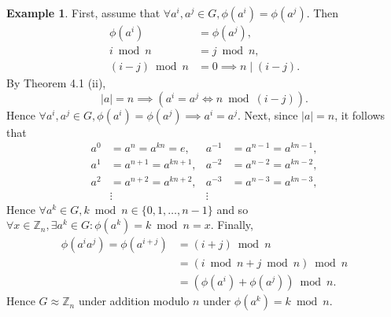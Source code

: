 \documentclass{article}
\theoremstyle{definition}
\newtheorem{example}{Example}[section]
\begin{document}
\begin{example}
    First, assume that $\forall a^i,a^j \in G, \phi(a^i) = \phi(a^j)$. Then
    \begin{align*}
        \phi(a^i) &= \phi(a^j), \\
        i \bmod n &= j \bmod n, \\
        (i-j) \bmod n &= 0 \implies n \mid (i-j).
    \end{align*}
    By Theorem 4.1 (ii),
    \begin{equation*}
        |a| = n \implies (a^i=a^j \iff n \bmod (i-j)).
    \end{equation*}
    Hence $\forall a^i,a^j \in G, \phi(a^i) = \phi(a^j) \implies a^i=a^j$. Next, since $|a| = n$, it follows that
    \begin{align*}
        a^0 &= a^n = a^{kn} = e, & a^{-1} &= a^{n-1} = a^{kn-1}, \\
        a^1 &= a^{n+1} = a^{kn+1}, & a^{-2} &= a^{n-2} = a^{kn-2}, \\
        a^2 &= a^{n+2} = a^{kn+2}, & a^{-3} &= a^{n-3} = a^{kn-3}, \\
        & \vdots & \vdots
    \end{align*}
    Hence $\forall a^k \in G, k \bmod n \in \{0,1,\dots,n-1\}$ and so $\forall x \in \mathbb{Z}_n, \exists a^k \in G: \phi(a^k)=k \bmod n=x$. Finally,
    \begin{align*}
        \phi(a^ia^j) = \phi(a^{i+j}) &= (i+j) \bmod n \\
        &= (i \bmod n + j \bmod n) \bmod n \\
        &= (\phi(a^i)+\phi(a^j)) \bmod n.
    \end{align*}
    Hence $G \approx \mathbb{Z}_n$ under addition modulo $n$ under $\phi(a^k) = k \bmod n$.
 \end{example}
 
\end{document}
